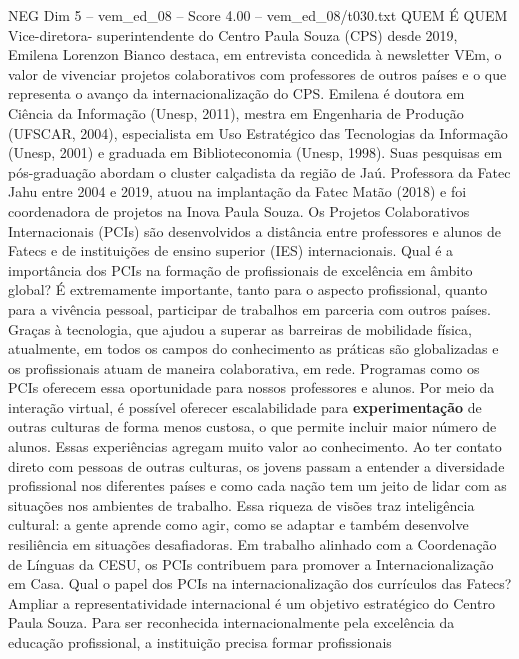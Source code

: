 \begin{textsample}{NEG Dim 5 – vem\_ed\_08 – Score 4.00 – vem\_ed\_08/t030.txt}  \label{ex:f5_neg_026}
QUEM É QUEM Vice-diretora- superintendente do Centro Paula Souza (CPS) desde 2019, Emilena Lorenzon Bianco destaca, em entrevista concedida à newsletter VEm, o valor de vivenciar projetos colaborativos com professores de outros países e o que representa o avanço da internacionalização do CPS.
Emilena é doutora em Ciência da Informação (Unesp, 2011), mestra em Engenharia de Produção (UFSCAR, 2004), especialista em Uso Estratégico das Tecnologias da Informação (Unesp, 2001) e graduada em Biblioteconomia (Unesp, 1998).
Suas pesquisas em pós-graduação abordam o cluster calçadista da região de Jaú.
Professora da Fatec Jahu entre 2004 e 2019, atuou na implantação da Fatec Matão (2018) e foi coordenadora de projetos na Inova Paula Souza.
Os Projetos Colaborativos Internacionais (PCIs) são desenvolvidos a distância entre professores e alunos de Fatecs e de instituições de ensino superior (IES) internacionais.
Qual é a importância dos PCIs na formação de profissionais de excelência em âmbito global?
É extremamente importante, tanto para o aspecto profissional, quanto para a vivência pessoal, participar de trabalhos em parceria com outros países.
Graças à tecnologia, que ajudou a superar as barreiras de mobilidade física, atualmente, em todos os campos do conhecimento as práticas são globalizadas e os profissionais atuam de maneira colaborativa, em rede.
Programas como os PCIs oferecem essa oportunidade para nossos professores e alunos.
Por meio da interação virtual, é possível oferecer escalabilidade para \textbf{experimentação} de outras culturas de forma menos custosa, o que permite incluir maior número de alunos.
Essas experiências agregam muito valor ao conhecimento.
Ao ter contato direto com pessoas de outras culturas, os jovens passam a entender a diversidade profissional nos diferentes países e como cada nação tem um jeito de lidar com as situações nos ambientes de trabalho.
Essa riqueza de visões traz inteligência cultural: a gente aprende como agir, como se adaptar e também desenvolve resiliência em situações desafiadoras.
Em trabalho alinhado com a Coordenação de Línguas da CESU, os PCIs contribuem para promover a Internacionalização em Casa.
Qual o papel dos PCIs na internacionalização dos currículos das Fatecs?
Ampliar a representatividade internacional é um objetivo estratégico do Centro Paula Souza.
Para ser reconhecida internacionalmente pela excelência da educação profissional, a instituição precisa formar profissionais

\end{textsample}
